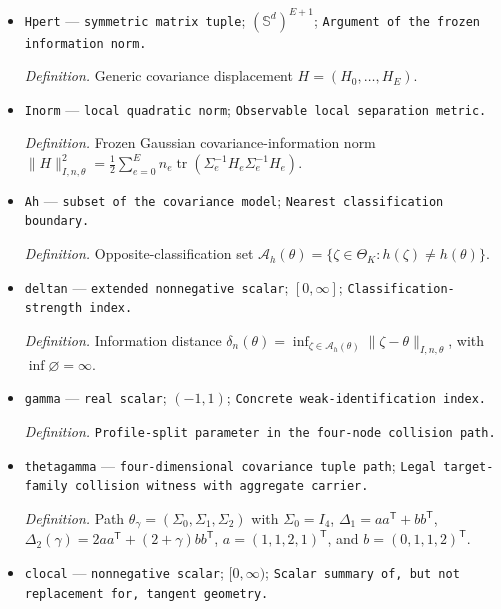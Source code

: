 \documentclass{article}
\begin{document}
\begin{itemize}
  \par\smallskip\noindent\emph{Definition.} Classification image \(\mathcal H_n=\{h(\zeta):\zeta\in R_n\cap\Theta_K\}\).
  \item \texttt{Hpert} --- \texttt{symmetric matrix tuple}; \((\mathbb S^d)^{E+1}\); \texttt{Argument of the frozen information norm.}
  \par\smallskip\noindent\emph{Definition.} Generic covariance displacement \(H=(H_0,\ldots,H_E)\).
  \item \texttt{Inorm} --- \texttt{local quadratic norm}; \texttt{Observable local separation metric.}
  \par\smallskip\noindent\emph{Definition.} Frozen Gaussian covariance-information norm \(\lVert H\rVert_{I,n,\theta}^2=\tfrac12\sum_{e=0}^{E}n_e\operatorname{tr}(\Sigma_e^{-1}H_e\Sigma_e^{-1}H_e)\).
  \item \texttt{Ah} --- \texttt{subset of the covariance model}; \texttt{Nearest classification boundary.}
  \par\smallskip\noindent\emph{Definition.} Opposite-classification set \(\mathcal A_h(\theta)=\{\zeta\in\Theta_K:h(\zeta)\ne h(\theta)\}\).
  \item \texttt{deltan} --- \texttt{extended nonnegative scalar}; \([0,\infty]\); \texttt{Classification-\allowbreak{}strength index.}
  \par\smallskip\noindent\emph{Definition.} Information distance \(\delta_n(\theta)=\inf_{\zeta\in\mathcal A_h(\theta)}\lVert\zeta-\theta\rVert_{I,n,\theta}\), with \(\inf\varnothing=\infty\).
  \item \texttt{gamma} --- \texttt{real scalar}; \((-1,1)\); \texttt{Concrete weak-\allowbreak{}identification index.}
  \par\smallskip\noindent\emph{Definition.} \texttt{Profile-\allowbreak{}split parameter in the four-\allowbreak{}node collision path.}
  \item \texttt{thetagamma} --- \texttt{four-\allowbreak{}dimensional covariance tuple path}; \texttt{Legal target-\allowbreak{}family collision witness with aggregate carrier.}
  \par\smallskip\noindent\emph{Definition.} Path \(\theta_\gamma=(\Sigma_0,\Sigma_1,\Sigma_2)\) with \(\Sigma_0=I_4\), \(\Delta_1=aa^{\mathsf T}+bb^{\mathsf T}\), \(\Delta_2(\gamma)=2aa^{\mathsf T}+(2+\gamma)bb^{\mathsf T}\), \(a=(1,1,2,1)^{\mathsf T}\), and \(b=(0,1,1,2)^{\mathsf T}\).
  \item \texttt{clocal} --- \texttt{nonnegative scalar}; \([0,\infty)\); \texttt{Scalar summary of,\allowbreak{} but not replacement for,\allowbreak{} tangent geometry.}

\end{itemize}
\end{document}
